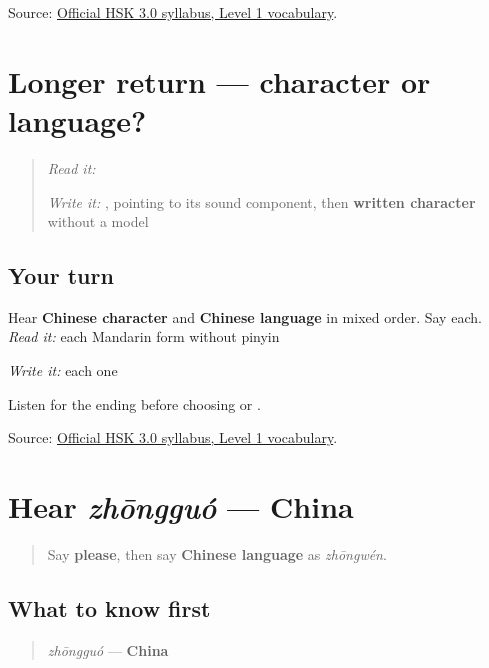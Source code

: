 \begin{tcolorbox}[breakable,colback=teal!4,colframe=teal!35!black,title={Before you move on}]
Source: \href{https://hsk.cn-bj.ufileos.com/3.0/\%E6\%96\%B0\%E7\%89\%88HSK\%E8\%80\%83\%E8\%AF\%95\%E5\%A4\%A7\%E7\%BA\%B21219.pdf}{Official HSK 3.0 syllabus, Level 1 vocabulary}.
\end{tcolorbox}
\section[Practice]{Longer return — character or language?}

\label{lesson:ZH-R17-character-language-r2}



\begin{quote}
\emph{Read it:} \textbf{}

\emph{Write it:} \textbf{}, pointing to its  sound component, then \textbf{written character} without a model
\end{quote}

\subsection*{Your turn}
Hear \textbf{Chinese character} and \textbf{Chinese language} in mixed order. Say each. \emph{Read it:} each Mandarin form without pinyin

\emph{Write it:} each one

Listen for the ending before choosing  or .

\begin{tcolorbox}[breakable,colback=teal!4,colframe=teal!35!black,title={Before you move on}]
Source: \href{https://hsk.cn-bj.ufileos.com/3.0/\%E6\%96\%B0\%E7\%89\%88HSK\%E8\%80\%83\%E8\%AF\%95\%E5\%A4\%A7\%E7\%BA\%B21219.pdf}{Official HSK 3.0 syllabus, Level 1 vocabulary}.
\end{tcolorbox}
\section[zhōngguó]{Hear \emph{zhōngguó} — China}

\label{lesson:ZH-C17-hear-zhongguo}



\begin{quote}
Say \textbf{please}, then say \textbf{Chinese language} as \emph{zhōngwén}.
\end{quote}

\subsection*{What to know first}
\begin{quote}
\emph{zhōngguó} — \textbf{China}
\end{quote}

